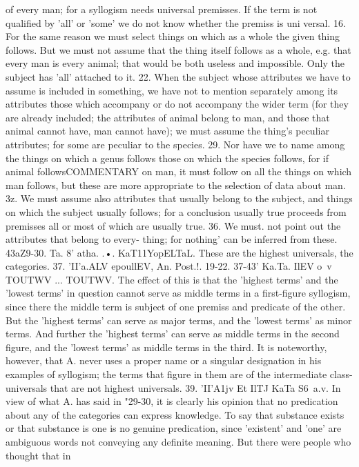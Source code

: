 {{{{{{{{{{{{{{{{{{{of every man; for a syllogism needs universal premisses. If the
term is not qualified by 'all' or 'some' we do not know whether the
premiss is uni versal.
16. For the same reason we must select things on which as a
whole the given thing follows. But we must not assume that the
thing itself follows as a whole, e.g. that every man is every
animal; that would be both useless and impossible. Only the
subject has 'all' attached to it.
22. When the subject whose attributes we have to assume is
included in something, we have not to mention separately among
its attributes those which accompany or do not accompany the
wider term (for they are already included; the attributes of
animal belong to man, and those that animal cannot have, man
cannot have); we must assume the thing's peculiar attributes;
for some are peculiar to the species.
29. Nor have we to name among the things on which a genus
follows those on which the species follows, for if animal followsCOMMENTARY
on man, it must follow on all the things on which man follows,
but these are more appropriate to the selection of data about man.
3z. We must assume also attributes that usually belong to the
subject, and things on which the subject usually follows; for a
conclusion usually true proceeds from premisses all or most of
which are usually true.
36. We must. not point out the attributes that belong to every-
thing; for nothing' can be inferred from these.
43aZ9-30. Ta. 8' atha. .•. KaT11YopELTaL. These are the highest
universals, the categories.
37. 'II'a.ALV epoullEV, An. Post.!. 19-22.
37-43' Ka.Ta. IlEV o~v TOUTWV ... TOUTWV. The effect of this is
that the 'highest terms' and the 'lowest terms' in question cannot
serve as middle terms in a first-figure syllogism, since there the
middle term is subject of one premiss and predicate of the other.
But the 'highest terms' can serve as major terms, and the 'lowest
terms' as minor terms. And further the 'highest terms' can serve
as middle terms in the second figure, and the 'lowest terms' as
middle terms in the third. It is noteworthy, however, that A.
never uses a proper name or a singular designation in his examples
of syllogism; the terms that figure in them are of the intermediate
class-universals that are not highest universals.
39. 'II'A1jv Et IlTJ KaTa S6~a.v. In view of what A. has said in
"29-30, it is clearly his opinion that no predication about any of
the categories can express knowledge. To say that substance
exists or that substance is one is no genuine predication, since
'existent' and 'one' are ambiguous words not conveying any
definite meaning. But there were people who thought that in
}}}}}}}}}}}}}}}}}}}

